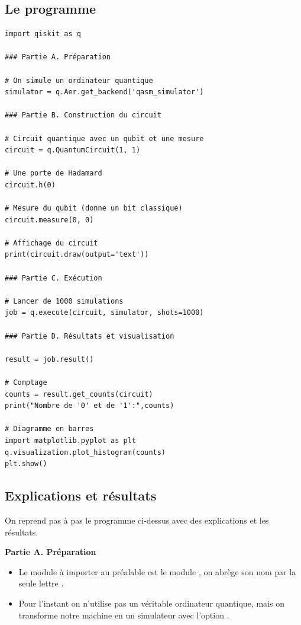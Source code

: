 \documentclass[11pt,class=report,crop=false]{standalone}
\begin{document}
\subsection{Le programme}

\begin{lstlisting}
import qiskit as q

### Partie A. Préparation

# On simule un ordinateur quantique
simulator = q.Aer.get_backend('qasm_simulator')

### Partie B. Construction du circuit

# Circuit quantique avec un qubit et une mesure
circuit = q.QuantumCircuit(1, 1)

# Une porte de Hadamard
circuit.h(0)

# Mesure du qubit (donne un bit classique)
circuit.measure(0, 0)

# Affichage du circuit
print(circuit.draw(output='text'))  

### Partie C. Exécution 

# Lancer de 1000 simulations
job = q.execute(circuit, simulator, shots=1000)

### Partie D. Résultats et visualisation

result = job.result()

# Comptage
counts = result.get_counts(circuit)
print("Nombre de '0' et de '1':",counts)

# Diagramme en barres
import matplotlib.pyplot as plt
q.visualization.plot_histogram(counts)
plt.show()
\end{lstlisting}

\subsection{Explications et résultats}

On reprend pas à pas le programme ci-dessus avec des explications et les résultats.

\textbf{Partie A. Préparation}

\begin{itemize}
  \item Le module \Python{} à importer au préalable est le module \qiskit{}, on abrège son nom par la seule lettre .
  \item Pour l'instant on n'utilise pas un véritable ordinateur quantique, mais on transforme notre machine en un simulateur avec l'option .
\end{itemize}
\end{document}
